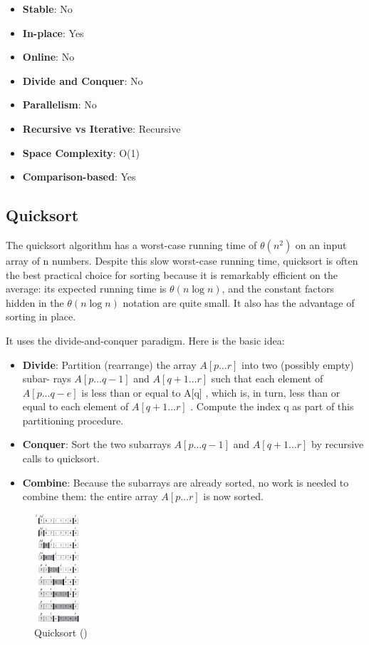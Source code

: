 \begin{itemize}
    \item \textbf{Stable}: No
    \item \textbf{In-place}: Yes
    \item \textbf{Online}: No
    \item \textbf{Divide and Conquer}: No
    \item \textbf{Parallelism}: No
    \item \textbf{Recursive vs Iterative}: Recursive
    \item \textbf{Space Complexity}: O(1)
    \item \textbf{Comparison-based}: Yes
\end{itemize}


\subsection{Quicksort}

The quicksort algorithm has a worst-case running time of $\theta (n^2)$ on an input array
of n numbers. Despite this slow worst-case running time, quicksort is often the best
practical choice for sorting because it is remarkably efficient on the average: its
expected running time is $\theta (n\log n)$, and the constant factors hidden in the $\theta (n\log n)$
notation are quite small. It also has the advantage of sorting in place.

It uses the divide-and-conquer paradigm. Here is the basic idea:
\begin{itemize}
    \item \textbf{Divide}: Partition (rearrange) the array $A[p\dots r]$ into two (possibly empty) subar-
    rays $A[p\dots q-1]$ and $A[q+1\dots r]$ such that each element of $A[p\dots q-e]$ is
    less than or equal to A[q] , which is, in turn, less than or equal to each element
    of $A[q+1\dots r]$ . Compute the index q as part of this partitioning procedure.
    \item \textbf{Conquer}: Sort the two subarrays $A[p\dots q-1]$ and $A[q+1\dots r]$ by recursive calls to quicksort.
    \item \textbf{Combine}: Because the subarrays are already sorted, no work is needed to combine them: the entire array $A[p\dots r]$ is now sorted.
\end{itemize}

\begin{figure}[H]
    \centering
    \includegraphics[width=0.15\textwidth]{assets/quicksort.png}
    \caption{Quicksort (\cite{cormen2022introduction})}
\end{figure}

